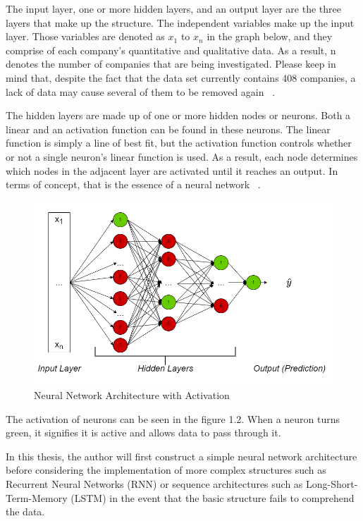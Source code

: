 \documentclass{imc-inf}
\begin{document}
The input layer, one or more hidden layers, and an output layer are the three layers that make up the structure. The independent variables make up the input layer. Those variables are denoted as $x_{1}$ to $x_{n}$ in the graph below, and they comprise of each company's quantitative and qualitative data. As a result, n denotes the number of companies that are being investigated. Please keep in mind that, despite the fact that the data set currently contains 408 companies, a lack of data may cause several of them to be removed again ~\cite{nn_intro}.

The hidden layers are made up of one or more hidden nodes or neurons. Both a linear and an activation function can be found in these neurons. The linear function is simply a line of best fit, but the activation function controls whether or not a single neuron's linear function is used. As a result, each node determines which nodes in the adjacent layer are activated until it reaches an output. In terms of concept, that is the essence of a neural network ~\cite{nn_intro}.

\begin{figure}[h]
	\centering
	\includegraphics[width=1.0\textwidth]{resources/nn activation.png}
	\caption{Neural Network Architecture with Activation}
	\label{fig:nn_intro}
\end{figure}

The activation of neurons can be seen in the figure 1.2. When a neuron turns green, it signifies it is active and allows data to pass through it.

In this thesis, the author will first construct a simple neural network architecture before considering the implementation of more complex structures such as Recurrent Neural Networks (RNN) or sequence architectures such as Long-Short-Term-Memory (LSTM) in the event that the basic structure fails to comprehend the data.
\end{document}

